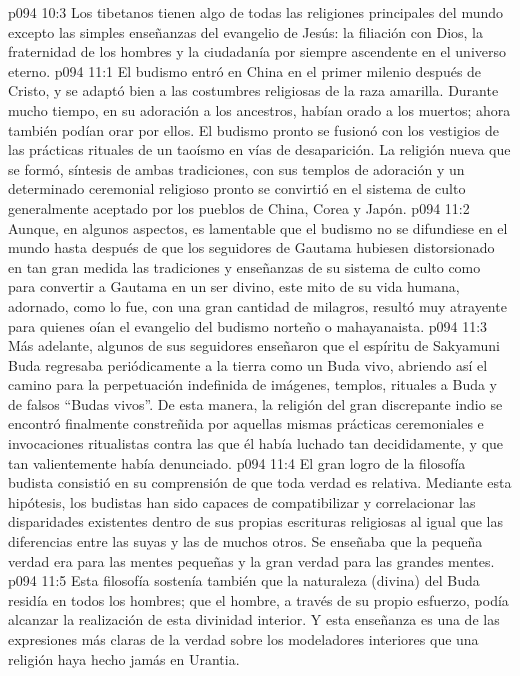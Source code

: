 \vs p094 10:3 Los tibetanos tienen algo de todas las religiones principales del mundo excepto las simples enseñanzas del evangelio de Jesús: la filiación con Dios, la fraternidad de los hombres y la ciudadanía por siempre ascendente en el universo eterno.
\vs p094 11:1 El budismo entró en China en el primer milenio después de Cristo, y se adaptó bien a las costumbres religiosas de la raza amarilla. Durante mucho tiempo, en su adoración a los ancestros, habían orado a los muertos; ahora también podían orar por ellos. El budismo pronto se fusionó con los vestigios de las prácticas rituales de un taoísmo en vías de desaparición. La religión nueva que se formó, síntesis de ambas tradiciones, con sus templos de adoración y un determinado ceremonial religioso pronto se convirtió en el sistema de culto generalmente aceptado por los pueblos de China, Corea y Japón.
\vs p094 11:2 \pc Aunque, en algunos aspectos, es lamentable que el budismo no se difundiese en el mundo hasta después de que los seguidores de Gautama hubiesen distorsionado en tan gran medida las tradiciones y enseñanzas de su sistema de culto como para convertir a Gautama en un ser divino, este mito de su vida humana, adornado, como lo fue, con una gran cantidad de milagros, resultó muy atrayente para quienes oían el evangelio del budismo norteño o mahayanaista.
\vs p094 11:3 Más adelante, algunos de sus seguidores enseñaron que el espíritu de Sakyamuni Buda regresaba periódicamente a la tierra como un Buda vivo, abriendo así el camino para la perpetuación indefinida de imágenes, templos, rituales a Buda y de falsos “Budas vivos”. De esta manera, la religión del gran discrepante indio se encontró finalmente constreñida por aquellas mismas prácticas ceremoniales e invocaciones ritualistas contra las que él había luchado tan decididamente, y que tan valientemente había denunciado.
\vs p094 11:4 \pc El gran logro de la filosofía budista consistió en su comprensión de que toda verdad es relativa. Mediante esta hipótesis, los budistas han sido capaces de compatibilizar y correlacionar las disparidades existentes dentro de sus propias escrituras religiosas al igual que las diferencias entre las suyas y las de muchos otros. Se enseñaba que la pequeña verdad era para las mentes pequeñas y la gran verdad para las grandes mentes.
\vs p094 11:5 Esta filosofía sostenía también que la naturaleza (divina) del Buda residía en todos los hombres; que el hombre, a través de su propio esfuerzo, podía alcanzar la realización de esta divinidad interior. Y esta enseñanza es una de las expresiones más claras de la verdad sobre los modeladores interiores que una religión haya hecho jamás en Urantia.
